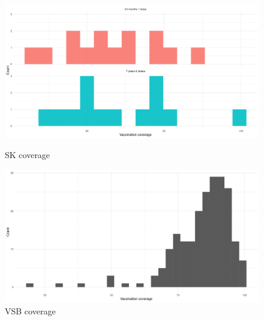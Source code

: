 \documentclass[12pt,a4paper]{article}
\begin{document}
\begin{figure}[!h]
\includegraphics[width=0.8\linewidth]{report-figs/f2.png}
\label{fig:skcov}
\caption{SK coverage}
\end{figure}


\begin{figure}[h!]
\includegraphics[width=0.8\linewidth]{report-figs/f3.png}
\caption{VSB coverage}
\label{fig:vsbcov}
\end{figure}
\end{document}
